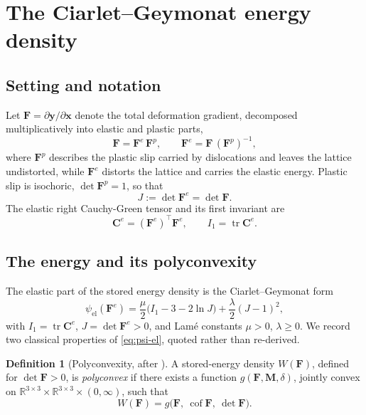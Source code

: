 \documentclass[12pt]{article}
\theoremstyle{plain}
\theoremstyle{definition}
\newtheorem{definition}[theorem]{Definition}
\newcommand{\bF}{\bm{F}}
\newcommand{\bC}{\bm{C}}
\newcommand{\by}{\bm{y}}
\newcommand{\bx}{\bm{x}}
\newcommand{\Fe}{\bF^{e}}
\newcommand{\Fp}{\bF^{p}}
\newcommand{\Ce}{\bC^{e}}
\newcommand{\R}{\mathbb{R}}
\newcommand{\tr}{\operatorname{tr}}
\newcommand{\cof}{\operatorname{cof}}
\begin{document}
\section{The Ciarlet--Geymonat energy density}\label{sec:CG}

\subsection{Setting and notation}\label{sec:setting}
Let $\bF=\partial\by/\partial\bx$ denote the total deformation gradient, decomposed
multiplicatively into elastic and plastic parts,
\begin{equation}\label{eq:FeFp}
  \bF=\Fe\,\Fp ,\qquad \Fe=\bF\,(\Fp)^{-1},
\end{equation}
where $\Fp$ describes the plastic slip carried by dislocations and leaves the
lattice undistorted, while $\Fe$ distorts the lattice and carries the elastic
energy. Plastic slip is isochoric, $\det\Fp=1$, so that
\begin{equation}\label{eq:J}
  J:=\det\Fe=\det\bF .
\end{equation}
The elastic right Cauchy-Green tensor and its first invariant are
\begin{equation}\label{eq:invariants}
  \Ce=(\Fe)^{\!\top}\Fe ,\qquad I_1=\tr\Ce .
\end{equation}

\subsection{The energy and its polyconvexity}\label{sec:polyconvex}
The elastic part of the stored energy density is the Ciarlet--Geymonat form
\begin{equation}\label{eq:psi-el}
  \psi_{\mathrm{el}}(\Fe)=\frac{\mu}{2}\bigl(I_1-3-2\ln J\bigr)
  +\frac{\lambda}{2}(J-1)^2,
\end{equation}
with $I_1=\tr\Ce$, $J=\det\Fe>0$, and Lam\'e constants $\mu>0$, $\lambda\ge0$.
We record two classical properties
of \eqref{eq:psi-el}, quoted rather than re-derived.

\begin{definition}[Polyconvexity, after \citet{ball1976convexity}]\label{def:polyconvex}
A stored-energy density $W(\bF)$, defined for $\det\bF>0$, is
\emph{polyconvex} if there exists a function $g(\bF,\bm{M},\delta)$, jointly
convex on $\R^{3\times3}\times\R^{3\times3}\times(0,\infty)$, such that
\begin{equation}\label{eq:polyconvex-def}
  W(\bF)=g\bigl(\bF,\ \cof\bF,\ \det\bF\bigr).
\end{equation}
\end{definition}
\end{document}
